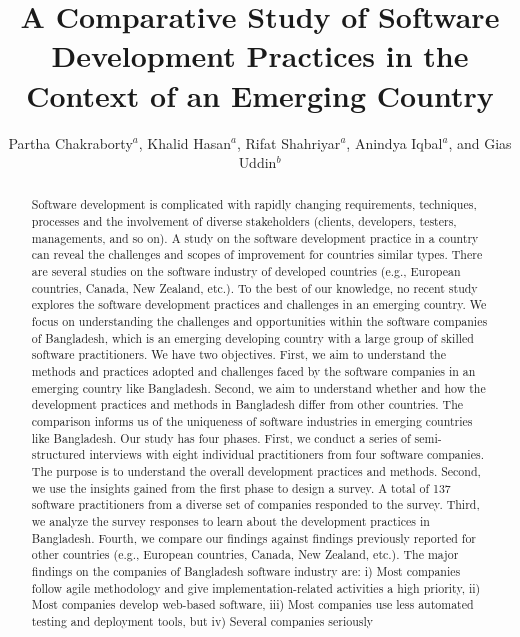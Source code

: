 \documentclass[review]{elsarticle}
\title{A Comparative Study of Software Development Practices in the Context of an Emerging Country}
\def\it{\textit}
\newcounter{finding_counter}
\begin{document}
\begin{frontmatter}



\author{Partha Chakraborty$^a$, Khalid Hasan$^a$, Rifat Shahriyar$^a$, Anindya Iqbal$^a$, and Gias Uddin$^b$}
\address{$^a$Bangladesh University of Engineering and Technology and $^b$University of Calgary}
\begin{abstract}%
Software development is complicated with rapidly changing requirements, techniques, processes and 
the involvement of diverse stakeholders (clients, developers, testers, managements, and so on). 
A study on the software development practice in a country
can reveal the challenges and scopes of improvement for countries similar types. There are several studies on the software industry
of developed countries (e.g., European countries, Canada, 
New Zealand, etc.). To the best of our knowledge, no recent study explores the software development practices and challenges
in an emerging country. 
We focus on understanding the challenges and
opportunities within the software companies of Bangladesh, which is an emerging
developing country with a large group of skilled software practitioners. We have
two objectives. First, we aim to understand the methods and practices 
adopted and challenges faced by the software companies in an emerging
country like Bangladesh. Second, we aim  to understand whether and how the development practices
and methods in Bangladesh differ from other countries. The comparison informs us
of the uniqueness of software industries in emerging countries like Bangladesh.
Our study has four phases. First, we conduct a series of
semi-structured interviews with eight individual practitioners from four
software companies. The purpose is to understand the overall development
practices and methods. Second, we use the insights gained from the first phase
to design a survey. A total of 137 software practitioners from a diverse set of
companies responded to the survey. Third, we analyze the survey responses to learn about the development 
practices in Bangladesh. Fourth, we compare our findings against findings previously reported for other countries (e.g., European countries, Canada, 
New Zealand, etc.).
The major findings on the companies of
Bangladesh software industry are: i) Most companies follow agile methodology
and give implementation-related activities a high priority, ii) Most companies
develop web-based software, iii) Most companies use less
automated testing and deployment tools, but iv) Several companies seriously

\end{abstract}
\end{frontmatter}
\end{document}
